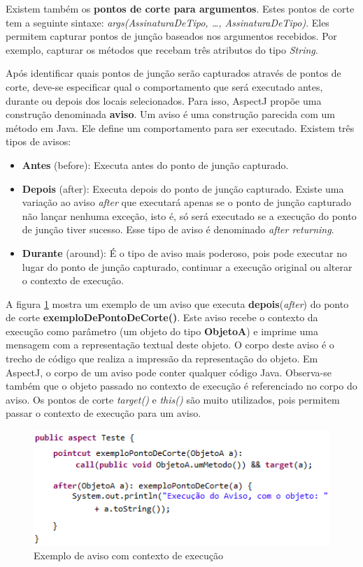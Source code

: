 Existem também os \textbf{pontos de corte para argumentos}.
Estes pontos de corte tem a seguinte sintaxe: \textit{args(AssinaturaDeTipo, 
\ldots , AssinaturaDeTipo)}. Eles permitem capturar pontos de junção
baseados nos argumentos recebidos. Por exemplo, capturar os métodos 
que recebam três atributos do tipo \textit{String}.

Após identificar quais pontos de junção serão capturados através de pontos de
corte, deve-se especificar qual o comportamento que será executado antes, 
durante ou depois dos locais selecionados. Para isso, AspectJ propõe uma
construção denominada \textbf{aviso}. Um aviso é uma construção parecida com um método
em Java. Ele define um comportamento para ser executado. Existem três tipos de
avisos:

\begin{itemize}
  \item \textbf{Antes} (before): Executa antes do ponto de junção capturado.
  \item \textbf{Depois} (after): Executa depois do ponto de junção capturado.
  Existe uma variação ao aviso \textit{after} que executará apenas se o ponto de
  junção capturado não lançar nenhuma exceção, isto é, só será executado se a execução
  do ponto de junção tiver sucesso. Esse tipo de aviso é denominado
  \textit{after returning}.
  \item \textbf{Durante} (around): É o tipo de aviso mais poderoso, pois
  pode executar no lugar do ponto de junção capturado, continuar a execução
  original ou alterar o contexto de execução.
\end{itemize}

A figura \ref{fig:advice_code} mostra um exemplo de um aviso que executa
\textbf{depois}(\textit{after}) do ponto de corte
\textbf{exemploDePontoDeCorte()}. Este aviso recebe o contexto da execução
como parâmetro (um objeto do tipo \textbf{ObjetoA}) e imprime uma
mensagem com a representação textual deste objeto. O corpo deste aviso é o
trecho de código que realiza a impressão da representação do objeto. Em AspectJ,
o corpo de um aviso pode conter qualquer código Java. Observa-se também que o
objeto passado no contexto de execução é referenciado no corpo do aviso. Os
pontos de corte \textit{target()} e \textit{this()} são muito utilizados, pois
permitem passar o contexto de execução para um aviso.

\begin{figure}[!hb]
	\centering
	\includegraphics{img/advice_code.png}
	\caption{Exemplo de aviso com contexto de execução}\label{fig:advice_code}
\end{figure}

